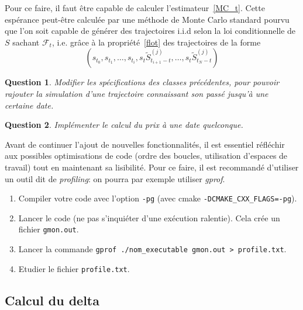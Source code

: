 \documentclass[a4paper,11pt]{article}
\def\cf{{\mathcal F}}
\newtheorem{question}{Question}
\begin{document}
Pour ce faire, il faut être capable de calculer l'estimateur~\eqref{MC_t}.  Cette
espérance peut-être calculée par une méthode de Monte Carlo standard pourvu que
l'on soit capable de générer des trajectoires i.i.d selon la loi conditionnelle
de $S$ sachant $\cf_t$, i.e. grâce à la propriété~\eqref{flot} des trajectoires
de la forme
\begin{equation*}
(s_{t_0}, s_{t_1}, \dots, s_{t_i}, s_t \tilde S_{t_{i+1} - t}^{(j)}, \dots,  s_t
\tilde S_{t_N - t}^{(j)})
\end{equation*}

\begin{question}
  Modifier les spécifications des classes précédentes, pour pouvoir rajouter la
  simulation d'une trajectoire connaissant son passé jusqu'à une certaine date.
\end{question}

\begin{question}
  Implémenter le calcul du prix à une date quelconque.
\end{question}


Avant de continuer l'ajout de nouvelles fonctionnalités, il est essentiel réfléchir aux
possibles optimisations de code (ordre des boucles, utilisation d'espaces de travail) tout
en maintenant sa lisibilité. Pour ce faire, il est recommandé d'utiliser un outil dit de
\emph{profiling}: on pourra par exemple utiliser \emph{gprof}.
\begin{enumerate}
  \item Compiler votre code avec l'option \verb!-pg! (avec cmake \verb!-DCMAKE_CXX_FLAGS=-pg!).
  \item Lancer le code (ne pas s'inquiéter d'une exécution ralentie). Cela crée un fichier
    \texttt{gmon.out}.
  \item Lancer la commande \texttt{gprof ./nom\_executable gmon.out > profile.txt}.
  \item Etudier le fichier \texttt{profile.txt}.
\end{enumerate}


\subsection{Calcul du delta}
\end{document}
